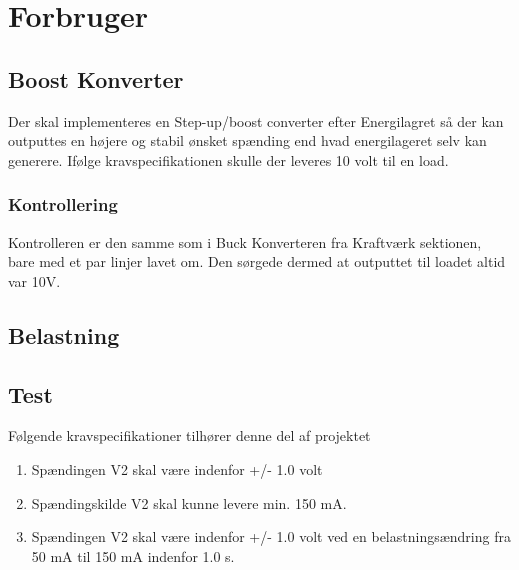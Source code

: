 \documentclass[../main.tex]{subfiles}
\begin{document}
\chapter{Forbruger} \label{Chap:Forbruger}

\section{Boost Konverter}
Der skal implementeres en Step-up/boost converter efter Energilagret så der kan outputtes en højere og stabil ønsket spænding end hvad energilageret selv kan generere. Ifølge kravspecifikationen skulle der leveres 10 volt til en load. 

\subsection{Kontrollering}
Kontrolleren er den samme som i Buck Konverteren fra Kraftværk sektionen, bare med et par linjer lavet om. Den sørgede dermed at outputtet til loadet altid var 10V.

\section{Belastning}

\section{Test}
Følgende kravspecifikationer tilhører denne del af projektet
\begin{enumerate}
  \item Spændingen V2 skal være indenfor +/- 1.0 volt
  \item Spændingskilde V2 skal kunne levere min. 150 mA.
  \item Spændingen V2 skal være indenfor +/- 1.0 volt ved en belastningsændring fra 50 mA til 150 mA indenfor 1.0 s.
\end{enumerate}
\end{document}
